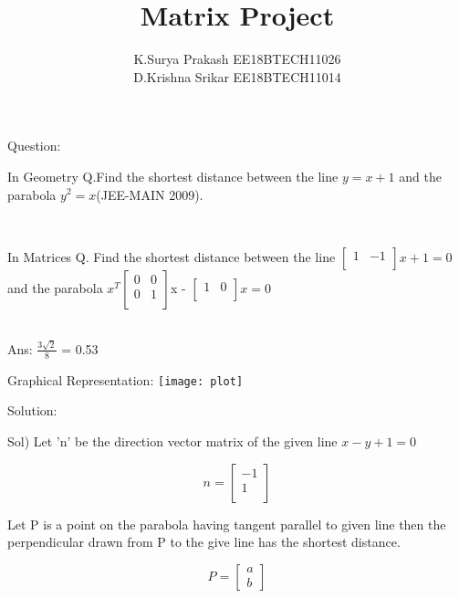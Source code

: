 \documentclass{beamer}
\title{Matrix Project}
\author[]{K.Surya Prakash EE18BTECH11026\\
          D.Krishna Srikar EE18BTECH11014}
\begin{document}
\maketitle

\begin{frame}{Question:}

\begin{block}{In Geometry}
Q.Find the shortest distance between the line $y = x+1$ and the parabola $y^2 = x$(JEE-MAIN 2009).
\end{block}
\\
\begin{block}{In Matrices}
Q. Find the shortest distance between the line   
$
\begin{bmatrix}
1&-1\\
\end{bmatrix}x + 1= 0$ and the parabola 
$x^T \begin{bmatrix}
0&0\\
0&1\\
\end{bmatrix}$x -
$\begin{bmatrix}
1&0\\
\end{bmatrix}x  = 0$
\end{block}
\\
Ans: \(\frac{3\sqrt{2}}{8}\)  = 0.53

\end{frame}


\begin{frame}{Graphical Representation:}
\texttt{[image: plot]}
\end{frame}

\begin{frame}{Solution:}

Sol) Let 'n' be the direction vector matrix  of the given line $x - y + 1 = 0$

$$
n = \begin{bmatrix}
-1 \\
1\\
\end{bmatrix}
$$

Let P is a point on the parabola having tangent parallel to given line then the perpendicular drawn from P to the give line has the shortest distance.

$$P =
\begin{bmatrix}
a\\
b
\end{bmatrix}$$

\end{frame}
\end{document}
